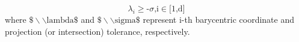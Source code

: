 \begin{equation} \label{eq:projtol}
	\lambda _i\text{$\geq $-$\sigma $,i$\in $[1,d]}
\end{equation}
where $\text{$\$\backslash \backslash $lambda$\$$}$ and $\text{$\$\backslash \backslash $sigma$\$$}$ represent i-th barycentric coordinate and projection (or intersection) tolerance, respectively.
